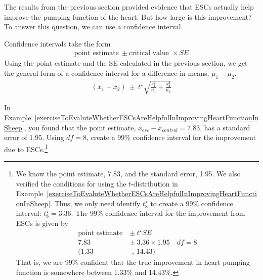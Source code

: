 The results from the previous section provided evidence that ESCs actually help improve the pumping function of the heart. But how large is this improvement? To answer this question, we can use a confidence interval.

Confidence intervals take the form
\begin{align*}
\text{point estimate} \ \pm \text{critical value }\times SE
\end{align*}
Using the point estimate and the SE calculated in the previous section, we get the general form of a confidence interval for a difference in means, $\mu_1-\mu_2$.
\begin{align*}
(\bar{x}_1-\bar{x}_2) \ \pm \ t^\star\sqrt{\frac{s_1^2}{n_1} + \frac{s_2^2}{n_2}}
\end{align*}

\begin{exercise}
In Example~\ref{exerciseToEvaluteWhetherESCsAreHelpfulInImprovingHeartFunctionInSheep}, you found that the point estimate, $\bar{x}_{esc} - \bar{x}_{control} = 7.83$, has a standard error of 1.95. Using $df=8$, create a 99\% confidence interval for the improvement due to ESCs.\footnote{We know the point estimate, 7.83, and the standard error, 1.95. We also verified the conditions for using the $t$-distribution in Example~\ref{exerciseToEvaluteWhetherESCsAreHelpfulInImprovingHeartFunctionInSheep}. Thus, we only need identify $t^{\star}_8$ to create a 99\% confidence interval: $t^{\star}_{8} = 3.36$. The 99\% confidence interval for the improvement from ESCs is given by
\begin{align*}
\text{point estimate}\ &\pm\ t^{\star}SE \\
7.83\ &\pm\ 3.36\times 1.95 \quad  df=8\\
(1.33 &\text{ , } 14.43)
\end{align*}
That is, we are 99\% confident that the true improvement in heart pumping function is somewhere between 1.33\% and 14.43\%.}


\end{exercise}

\textA{\newpage}

